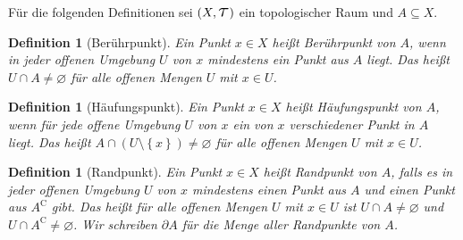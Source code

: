 \documentclass[11pt, twoside, a4paper]{article}
\theoremstyle{plain}
\newtheorem{definition}[blockelement]{Definition}
\numberwithin{equation}{subsection}
\newcommand{\set}[1]{\left\{#1\right\}}
\newcommand{\pair}[1]{\left(#1\right)}
\newcommand{\exclude}[0]{\setminus}
\renewcommand{\emptyset}{\varnothing}
\begin{document}
    \begin{mdframed}
        \begin{center}
            Für die folgenden Definitionen sei $\pair{X, \Tau}$ ein topologischer Raum und $A\subseteq X$.
        \end{center}
    \end{mdframed}

    \begin{definition}[Berührpunkt]
        Ein Punkt $x\in X$ heißt Berührpunkt von $A$, wenn in jeder offenen Umgebung $U$ von $x$ mindestens ein Punkt aus $A$ liegt. Das heißt $U\cap A \neq \emptyset$ für alle offenen Mengen $U$ mit $x\in U$.
    \end{definition}

    \begin{definition}[Häufungspunkt]
        Ein Punkt $x\in X$ heißt Häufungspunkt von $A$, wenn für jede offene Umgebung $U$ von $x$ ein von $x$ verschiedener Punkt in $A$ liegt. Das heißt $A\cap \pair{U\exclude\set{x}} \neq \emptyset$ für alle offenen Mengen $U$ mit $x\in U$.
    \end{definition}

    \begin{definition}[Randpunkt]
        Ein Punkt $x\in X$ heißt Randpunkt von $A$, falls es in jeder offenen Umgebung $U$ von $x$ mindestens einen Punkt aus $A$ und einen Punkt aus $A^{\mathrm{C}}$ gibt. Das heißt für alle offenen Mengen $U$ mit $x\in U$ ist $U\cap A \neq \emptyset$ und $U\cap A^{\mathrm{C}} \neq \emptyset$. Wir schreiben $\partial A$ für die Menge aller Randpunkte von $A$.
    \end{definition}
\end{document}

